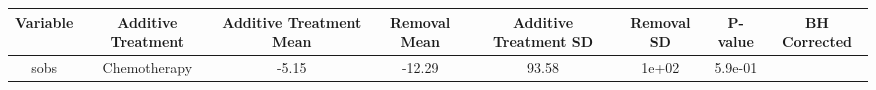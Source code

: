 \documentclass[12pt,]{article}
\begin{document}
\begin{longtable}[]{@{}cccccccc@{}}
\toprule
\begin{minipage}[b]{0.12\columnwidth}\centering\strut
Variable\strut
\end{minipage} & \begin{minipage}[b]{0.11\columnwidth}\centering\strut
Additive Treatment\strut
\end{minipage} & \begin{minipage}[b]{0.13\columnwidth}\centering\strut
Additive Treatment Mean\strut
\end{minipage} & \begin{minipage}[b]{0.08\columnwidth}\centering\strut
Removal Mean\strut
\end{minipage} & \begin{minipage}[b]{0.13\columnwidth}\centering\strut
Additive Treatment SD\strut
\end{minipage} & \begin{minipage}[b]{0.07\columnwidth}\centering\strut
Removal SD\strut
\end{minipage} & \begin{minipage}[b]{0.06\columnwidth}\centering\strut
P-value\strut
\end{minipage} & \begin{minipage}[b]{0.08\columnwidth}\centering\strut
BH Corrected\strut
\end{minipage}\tabularnewline
\midrule
\endhead
\begin{minipage}[t]{0.12\columnwidth}\centering\strut
sobs\strut
\end{minipage} & \begin{minipage}[t]{0.11\columnwidth}\centering\strut
Chemotherapy\strut
\end{minipage} & \begin{minipage}[t]{0.13\columnwidth}\centering\strut
-5.15\strut
\end{minipage} & \begin{minipage}[t]{0.08\columnwidth}\centering\strut
-12.29\strut
\end{minipage} & \begin{minipage}[t]{0.13\columnwidth}\centering\strut
93.58\strut
\end{minipage} & \begin{minipage}[t]{0.07\columnwidth}\centering\strut
1e+02\strut
\end{minipage} & \begin{minipage}[t]{0.06\columnwidth}\centering\strut
5.9e-01\strut
\end{minipage} & \begin{minipage}[t]{0.08\columnwidth}\centering\strut

\end{minipage}
\end{longtable}
\end{document}
